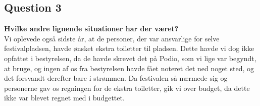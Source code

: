 \subsection{Question 3}
\label{sub:i4q3}
\noindent \textbf{Hvilke andre lignende situationer har der været?}
\\
Vi oplevede også sidste år, at de personer, der var ansvarlige for selve festivalpladsen, havde
ønsket ekstra toiletter til pladsen. Dette havde vi dog ikke opfattet i bestyrelsen, da de havde
skrevet det på Podio, som vi lige var begyndt, at bruge, og ingen af os fra bestyrelsen havde fået
noteret det ned noget sted, og det forsvandt derefter bare i strømmen. Da festivalen så nærmede sig
og personerne gav os regningen for de ekstra toiletter, gik vi over budget, da dette ikke var blevet
regnet med i budgettet.
